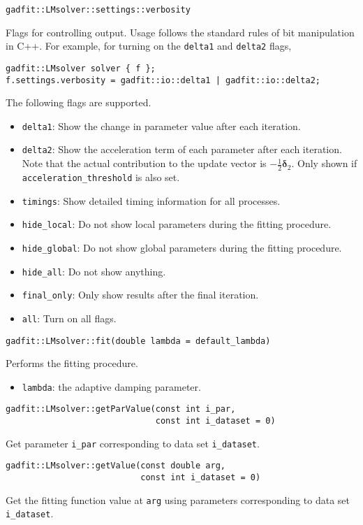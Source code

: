 \documentclass{article}
\begin{document}
\begin{verbatim}
gadfit::LMsolver::settings::verbosity
\end{verbatim}
Flags for controlling output. Usage follows the standard rules of bit manipulation in C++. For example, for turning on the \verb+delta1+ and \verb+delta2+ flags,
\begin{verbatim}
gadfit::LMsolver solver { f };
f.settings.verbosity = gadfit::io::delta1 | gadfit::io::delta2;
\end{verbatim}
The following flags are supported.
\begin{itemize}
\item \verb+delta1+: Show the change in parameter value after each iteration.
\item \verb+delta2+: Show the acceleration term of each parameter after each iteration. Note that the actual contribution to the update vector is $-\frac{1}{2}\bm\delta_2$. Only shown if \verb+acceleration_threshold+ is also set.
\item \verb+timings+: Show detailed timing information for all processes.
\item \verb+hide_local+: Do not show local parameters during the fitting procedure.
\item \verb+hide_global+: Do not show global parameters during the fitting procedure.
\item \verb+hide_all+: Do not show anything.
\item \verb+final_only+: Only show results after the final iteration.
\item \verb+all+: Turn on all flags.
\end{itemize}

\begin{verbatim}
gadfit::LMsolver::fit(double lambda = default_lambda)
\end{verbatim}
Performs the fitting procedure.
\begin{itemize}
\item \verb+lambda+: the adaptive damping parameter.
\end{itemize}

\begin{verbatim}
gadfit::LMsolver::getParValue(const int i_par,
                              const int i_dataset = 0)
\end{verbatim}
Get parameter \verb+i_par+ corresponding to data set \verb+i_dataset+.

\begin{verbatim}
gadfit::LMsolver::getValue(const double arg,
                           const int i_dataset = 0)
\end{verbatim}
Get the fitting function value at \texttt{arg} using parameters corresponding to data set \verb+i_dataset+.
\end{document}
